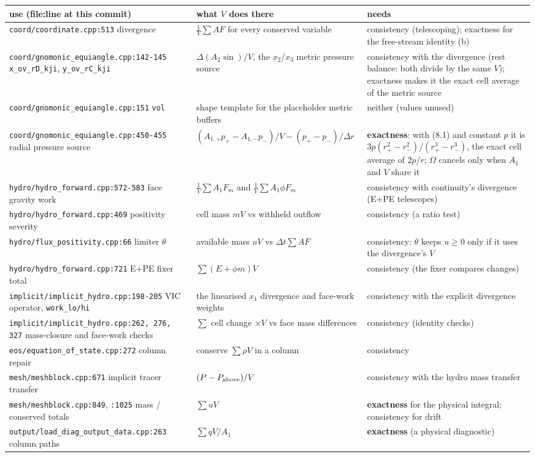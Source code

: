 \documentclass[11pt,a4paper]{article}
\begin{document}
\begin{longtable}{lll}
\toprule
use (file:line at this commit) & what $V$ does there & needs \\
\midrule
\texttt{coord/coordinate.cpp:513} divergence & $\frac{1}{V}\sum A F$ for every conserved variable & consistency (telescoping); exactness for the free-stream identity (b) \\
\texttt{coord/gnomonic\_equiangle.cpp:142-145} \texttt{x\_ov\_rD\_kji}, \texttt{y\_ov\_rC\_kji} & $\Delta(A_2\sin)/V$, the $x_2$/$x_3$ metric pressure source & consistency with the divergence (rest balance: both divide by the same $V$); exactness makes it the exact cell average of the metric source \\
\texttt{coord/gnomonic\_equiangle.cpp:151} \texttt{vol} & shape template for the placeholder metric buffers & neither (values unused) \\
\texttt{coord/gnomonic\_equiangle.cpp:450-455} radial pressure source & $(A_{1,+}p_+ - A_{1,-}p_-)/V - (p_+-p_-)/\Delta r$ & \textbf{exactness}: with (8.1) and constant $p$ it is $3p(r_+^2-r_-^2)/(r_+^3-r_-^3)$, the exact cell average of $2p/r$; $\Omega$ cancels only when $A_1$ and $V$ share it \\
\texttt{hydro/hydro\_forward.cpp:572-583} face gravity work & $\frac1V\sum A_1 F_m$ and $\frac1V\sum A_1\phi F_m$ & consistency with continuity's divergence (E+PE telescopes) \\
\texttt{hydro/hydro\_forward.cpp:469} positivity severity & cell mass $mV$ vs withheld outflow & consistency (a ratio test) \\
\texttt{hydro/flux\_positivity.cpp:66} limiter $\theta$ & available mass $uV$ vs $\Delta t\sum A F$ & consistency: $\theta$ keeps $u\ge0$ only if it uses the divergence's $V$ \\
\texttt{hydro/hydro\_forward.cpp:721} E+PE fixer total & $\sum(E+\phi m)V$ & consistency (the fixer compares changes) \\
\texttt{implicit/implicit\_hydro.cpp:198-205} VIC operator, \texttt{work\_lo/hi} & the linearised $x_1$ divergence and face-work weights & consistency with the explicit divergence \\
\texttt{implicit/implicit\_hydro.cpp:262, 276, 327} mass-closure and face-work checks & $\sum$ cell change $\times V$ vs face mass differences & consistency (identity checks) \\
\texttt{eos/equation\_of\_state.cpp:272} column repair & conserve $\sum\rho V$ in a column & consistency \\
\texttt{mesh/meshblock.cpp:671} implicit tracer transfer & $(P-P_{\rm above})/V$ & consistency with the hydro mass transfer \\
\texttt{mesh/meshblock.cpp:849}, \texttt{:1025} mass / conserved totals & $\sum uV$ & \textbf{exactness} for the physical integral; consistency for drift \\
\texttt{output/load\_diag\_output\_data.cpp:263} column paths & $\sum q V / A_1$ & \textbf{exactness} (a physical diagnostic) \\
\bottomrule
\end{longtable}
\end{document}
